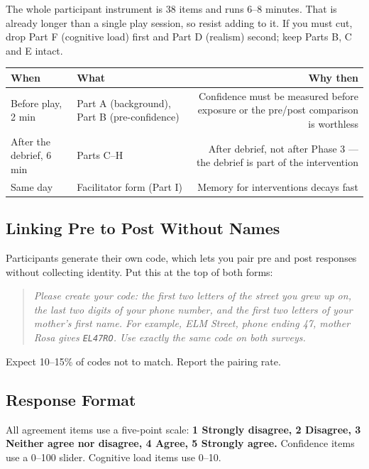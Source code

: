 \documentclass[11pt,letterpaper]{article}
\begin{document}
The whole participant instrument is 38 items and runs 6--8 minutes. That is
already longer than a single play session, so resist adding to it. If you must
cut, drop Part F (cognitive load) first and Part D (realism) second; keep Parts
B, C and E intact.

\begin{center}
\small
\begin{tabularx}{\textwidth}{@{}l l R@{}}
\toprule
\textbf{When} & \textbf{What} & \textbf{Why then} \\
\midrule
Before play, 2 min & Part A (background), Part B (pre-confidence) & Confidence
must be measured before exposure or the pre/post comparison is worthless \\
After the debrief, 6 min & Parts C--H & After debrief, not after Phase 3 --- the
debrief is part of the intervention \\
Same day & Facilitator form (Part I) & Memory for interventions decays fast \\
\bottomrule
\end{tabularx}
\end{center}

\subsection{Linking Pre to Post Without Names}

Participants generate their own code, which lets you pair pre and post responses
without collecting identity. Put this at the top of both forms:

\begin{quote}\itshape
Please create your code: the first two letters of the street you grew up on, the
last two digits of your phone number, and the first two letters of your mother's
first name. For example, ELM Street, phone ending 47, mother Rosa gives
\texttt{EL47RO}. Use exactly the same code on both surveys.
\end{quote}

Expect 10--15\% of codes not to match. Report the pairing rate.

\subsection{Response Format}

All agreement items use a five-point scale: \textbf{1 Strongly disagree,
2 Disagree, 3 Neither agree nor disagree, 4 Agree, 5 Strongly agree.} Confidence
items use a 0--100 slider. Cognitive load items use 0--10.
\end{document}
